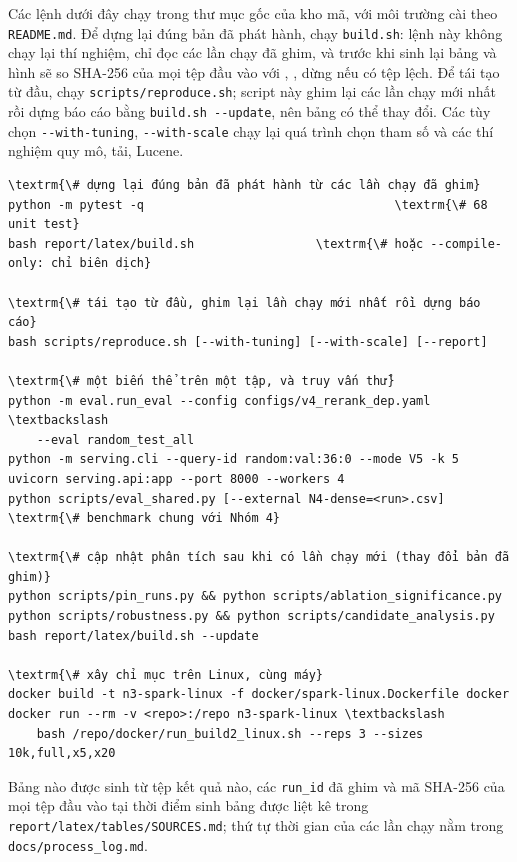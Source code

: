 \documentclass[11pt,a4paper,oneside]{report}
\newcommand{\code}[1]{\texttt{#1}}
\begin{document}
Các lệnh dưới đây chạy trong thư mục gốc của kho mã, với môi trường cài theo \code{README.md}. Để dựng lại đúng bản đã
phát hành, chạy \code{build.sh}: lệnh này không chạy lại thí nghiệm, chỉ đọc các lần chạy đã ghim, và trước khi sinh lại bảng
và hình sẽ so SHA-256 của mọi tệp đầu vào với , , dừng nếu có tệp lệch. Để
tái tạo từ đầu, chạy \code{scripts/reproduce.sh}; script này ghim lại các lần chạy mới nhất rồi dựng báo cáo bằng
\code{build.sh -{}-update}, nên bảng có thể thay đổi. Các tùy chọn \code{-{}-with-tuning}, \code{-{}-with-scale} chạy lại quá
trình chọn tham số và các thí nghiệm quy mô, tải, Lucene.

\begin{Verbatim}[fontsize=\footnotesize,frame=single,framesep=2mm,commandchars=\\\{\}]
\textrm{\# dựng lại đúng bản đã phát hành từ các lần chạy đã ghim}
python -m pytest -q                                   \textrm{\# 68 unit test}
bash report/latex/build.sh                 \textrm{\# hoặc --compile-only: chỉ biên dịch}

\textrm{\# tái tạo từ đầu, ghim lại lần chạy mới nhất rồi dựng báo cáo}
bash scripts/reproduce.sh [--with-tuning] [--with-scale] [--report]

\textrm{\# một biến thể trên một tập, và truy vấn thử}
python -m eval.run_eval --config configs/v4_rerank_dep.yaml \textbackslash
    --eval random_test_all
python -m serving.cli --query-id random:val:36:0 --mode V5 -k 5
uvicorn serving.api:app --port 8000 --workers 4
python scripts/eval_shared.py [--external N4-dense=<run>.csv]  \textrm{\# benchmark chung với Nhóm 4}

\textrm{\# cập nhật phân tích sau khi có lần chạy mới (thay đổi bản đã ghim)}
python scripts/pin_runs.py && python scripts/ablation_significance.py
python scripts/robustness.py && python scripts/candidate_analysis.py
bash report/latex/build.sh --update

\textrm{\# xây chỉ mục trên Linux, cùng máy}
docker build -t n3-spark-linux -f docker/spark-linux.Dockerfile docker
docker run --rm -v <repo>:/repo n3-spark-linux \textbackslash
    bash /repo/docker/run_build2_linux.sh --reps 3 --sizes 10k,full,x5,x20
\end{Verbatim}

Bảng nào được sinh từ tệp kết quả nào, các \code{run\_id} đã ghim và mã SHA-256 của mọi tệp đầu vào tại thời điểm sinh
bảng được liệt kê trong \code{report/latex/tables/SOURCES.md}; thứ tự thời gian của các lần chạy nằm trong
\code{docs/process\_log.md}.
\end{document}
